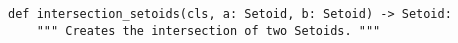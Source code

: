 \begin{verbatim}
def intersection_setoids(cls, a: Setoid, b: Setoid) -> Setoid:
    """ Creates the intersection of two Setoids. """
\end{verbatim}